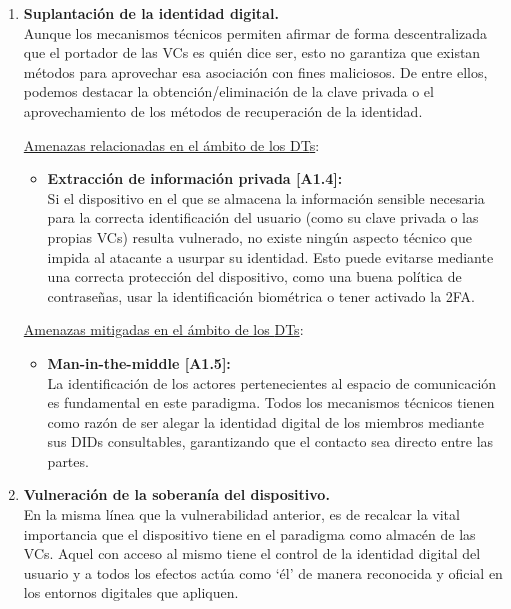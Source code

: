 \documentclass[../main.tex]{subfiles}
\begin{document}
\begin{enumerate}[label=\textbf{R1.\arabic*}, leftmargin=48pt]
    \item \textbf{Suplantación de la identidad digital.}\label{R1.2}
    \\ Aunque los mecanismos técnicos permiten afirmar de forma descentralizada que el portador de las \acrshort{VC}s es quién dice ser, esto no garantiza que existan métodos para aprovechar esa asociación con fines maliciosos. De entre ellos, podemos destacar la obtención/eliminación de la clave privada o el aprovechamiento de los métodos de recuperación de la identidad. 

    \underline{Amenazas relacionadas en el ámbito de los \acrshort{DT}s}:
    \begin{itemize}
        \item \textbf{Extracción de información privada [A1.4]:}\label{A1.4}
        \\ Si el dispositivo en el que se almacena la información sensible necesaria para la correcta identificación del usuario (como su clave privada o las propias \acrshort{VC}s) resulta vulnerado, no existe ningún aspecto técnico que impida al atacante a usurpar su identidad. Esto puede evitarse mediante una correcta protección del dispositivo, como una buena política de contraseñas, usar la identificación biométrica o tener activado la \Gls{2FA}.
    \end{itemize}
    
    \underline{Amenazas mitigadas en el ámbito de los \acrshort{DT}s}: 
    \begin{itemize}
        \item \textbf{Man-in-the-middle [A1.5]:}\label{A1.5}
        \\ La identificación de los actores pertenecientes al espacio de comunicación es fundamental en este paradigma. Todos los mecanismos técnicos tienen como razón de ser alegar la identidad digital de los miembros mediante sus \acrshort{DID}s consultables, garantizando que el contacto sea directo entre las partes. 
        \\
    \end{itemize}

    \item \textbf{Vulneración de la soberanía del dispositivo.}\label{R1.3}
    \\ En la misma línea que la vulnerabilidad anterior, es de recalcar la vital importancia que el dispositivo tiene en el paradigma como almacén de las \acrshort{VC}s. Aquel con acceso al mismo tiene el control de la identidad digital del usuario y a todos los efectos actúa como `él' de manera reconocida y oficial en los entornos digitales que apliquen. 
    

\end{enumerate}
\end{document}
